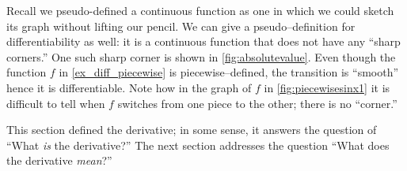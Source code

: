 Recall we pseudo-defined a continuous function as one in which we could sketch its graph without lifting our pencil. We can give a pseudo--definition for differentiability as well: it is a continuous function that does not have any ``sharp corners.'' One such sharp corner is shown in \autoref{fig:absolutevalue}. Even though the function $f$ in \autoref{ex_diff_piecewise} is piecewise--defined, the transition is ``smooth'' hence it is differentiable. Note how in the graph of $f$ in \autoref{fig:piecewisesinx1} it is difficult to tell when $f$ switches from one piece to the other; there is no ``corner.''


This section defined the derivative; in some sense, it answers the question of ``What \textit{is} the derivative?'' The next section addresses the question ``What does the derivative \textit{mean}?''



